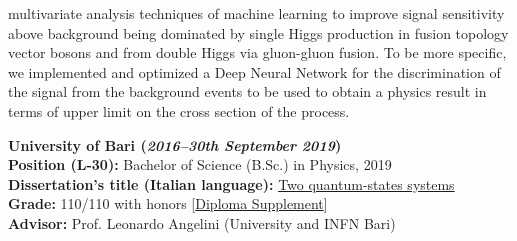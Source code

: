 \documentclass[11pt]{res}
\begin{document}
\begin{resume}
multivariate analysis techniques of machine learning to improve signal sensitivity above background being dominated by single Higgs production in fusion topology vector bosons and from double Higgs via gluon-gluon fusion. To be more specific, we implemented and optimized a Deep Neural Network for the discrimination of the signal from the background events to be used to obtain a physics result in terms of upper limit on the cross section of the process.

\textbf{University of Bari (\textit{2016--30th September 2019})}\\
\textbf{Position (L-30):} Bachelor of Science (B.Sc.) in Physics, 2019\\
\textbf{Dissertation's title (Italian language):} 
\href{https://drive.google.com/file/d/1fyNx6B4lviqkeJxsrIEsZ-UJhCTqDaSC/view?usp=share_link}{Two quantum-states systems}\\
\textbf{Grade:} 110/110 with honors [\href{https://drive.google.com/file/d/1V2sxudg9bGwW-S0WduNndtO60tdJLPUf/view?usp=sharing}{Diploma Supplement}]\\
\textbf{Advisor:} Prof. Leonardo Angelini (University and INFN Bari)



\end{resume}
\end{document}

